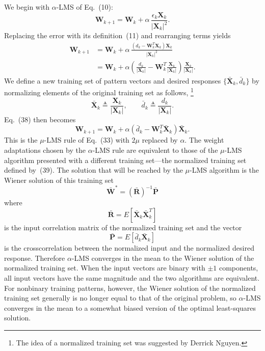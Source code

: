 \documentclass[10pt,twocolumn]{article}
\newcommand{\X}{\bm{X}}
\newcommand{\W}{\bm{W}}
\newcommand{\R}{\bm{R}}
\newcommand{\Pv}{\bm{P}}
\begin{document}
We begin with $\alpha$-LMS of Eq.~(10):
\begin{equation}
\W_{k+1} = \W_k + \alpha\,\frac{\epsilon_k\X_k}{|\X_k|^2}. \tag{36}
\end{equation}
Replacing the error with its definition~(11) and rearranging terms yields
\begin{align}
\W_{k+1} &= \W_k + \alpha\,\frac{(d_k - \W_k^{T}\X_k)\X_k}{|\X_k|^2} \tag{37}\\
&= \W_k + \alpha\!\left(\frac{d_k}{|\X_k|} - \W_k^{T}\frac{\X_k}{|\X_k|}\right)\frac{\X_k}{|\X_k|}. \tag{38}
\end{align}
We define a new training set of pattern vectors and desired responses
$\{\bar{\X}_k, \bar{d}_k\}$ by normalizing elements of the original training set as
follows,%
\footnote{The idea of a normalized training set was suggested by Derrick Nguyen.}
\begin{equation}
\bar{\X}_k \triangleq \frac{\X_k}{|\X_k|}, \qquad
\bar{d}_k \triangleq \frac{d_k}{|\X_k|}. \tag{39}
\end{equation}
Eq.~(38) then becomes
\begin{equation}
\W_{k+1} = \W_k + \alpha(\bar{d}_k - \W_k^{T}\bar{\X}_k)\bar{\X}_k. \tag{40}
\end{equation}
This is the $\mu$-LMS rule of Eq.~(33) with $2\mu$ replaced by $\alpha$. The weight
adaptations chosen by the $\alpha$-LMS rule are equivalent to those of the
$\mu$-LMS algorithm presented with a different training set---the normalized
training set defined by~(39). The solution that will be reached by the $\mu$-LMS
algorithm is the Wiener solution of this training set
\begin{equation}
\bar{\W}^{*} = (\bar{\R})^{-1}\bar{\Pv} \tag{41}
\end{equation}
where
\begin{equation}
\bar{\R} = E[\bar{\X}_k\bar{\X}_k^{T}] \tag{42}
\end{equation}
is the input correlation matrix of the normalized training set and the vector
\begin{equation}
\bar{\Pv} = E[\bar{d}_k\bar{\X}_k] \tag{43}
\end{equation}
is the crosscorrelation between the normalized input and the normalized desired
response. Therefore $\alpha$-LMS converges in the mean to the Wiener solution of
the normalized training set. When the input vectors are binary with $\pm 1$
components, all input vectors have the same magnitude and the two algorithms are
equivalent. For nonbinary training patterns, however, the Wiener solution of the
normalized training set generally is no longer equal to that of the original
problem, so $\alpha$-LMS converges in the mean to a somewhat biased version of the
optimal least-squares solution.
\end{document}
